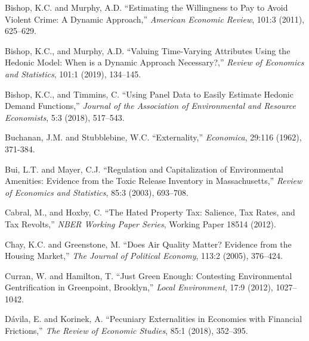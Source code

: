 \documentclass[ecta,nameyear,draft]{econsocart}
\theoremstyle{plain}
\theoremstyle{remark}
\begin{document}
\begin{thebibliography}{}
\textup{Bishop, K.C. and Murphy, A.D.} %
``Estimating the Willingness to Pay to Avoid Violent Crime: A Dynamic Approach,''
\textit{American Economic Review}, 101:3 (2011), 625--629.
\endbibitem

\textup{Bishop, K.C., and Murphy, A.D.} %
``Valuing Time-Varying Attributes Using the Hedonic Model: When is a Dynamic Approach Necessary?,''
\textit{Review of Economics and Statistics}, 101:1 (2019), 134--145.
\endbibitem

\textup{Bishop, K.C., and Timmins, C.} %
``Using Panel Data to Easily Estimate Hedonic Demand Functions,''
\textit{Journal of the Association of Environmental and Resource Economists}, 5:3 (2018), 517--543.
\endbibitem

\textup{Buchanan, J.M. and Stubblebine, W.C.} %
``Externality,''
\textit{Economica}, 29:116 (1962), 371-384.
\endbibitem

\textup{Bui, L.T. and Mayer, C.J.} %
``Regulation and Capitalization of Environmental Amenities: Evidence from the Toxic Release Inventory in Massachusetts,''
\textit{Review of Economics and Statistics}, 85:3 (2003), 693--708.
\endbibitem


\textup{Cabral, M., and Hoxby, C.} %
``The Hated Property Tax: Salience, Tax Rates, and Tax Revolts,''
\textit{NBER Working Paper Series}, Working Paper 18514 (2012).
\endbibitem

\textup{Chay, K.C. and Greenstone, M.} %
``Does Air Quality Matter? Evidence from the Housing Market,''
\textit{The Journal of Political Economy}, 113:2 (2005), 376--424.
\endbibitem

 
\textup{Curran, W. and Hamilton, T.} %
``Just Green Enough: Contesting Environmental Gentrification in Greenpoint, Brooklyn,''
\textit{Local Environment}, 17:9 (2012), 1027--1042.
\endbibitem

 
\textup{Dávila, E. and Korinek, A.} %
``Pecuniary Externalities in Economies with Financial Frictions,''
\textit{The Review of Economic Studies}, 85:1 (2018), 352--395.
\endbibitem
 

\end{thebibliography}
\end{document}
